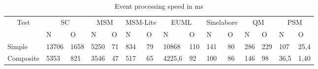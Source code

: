 \begin{table}[]
	\centering
	\caption{Event processing speed in ms}
	\label{table-speed}
	\begin{tabular}{|l|l|l|l|l|l|l|l|l|l|l|l|l|l|l|}
		\hline
		\multicolumn{1}{|c|}{\multirow{2}{*}{Test}} & \multicolumn{2}{c|}{SC} & \multicolumn{2}{c|}{MSM} & \multicolumn{2}{c|}{MSM-Lite} & \multicolumn{2}{c|}{EUML} & \multicolumn{2}{c|}{Sinelabore} & \multicolumn{2}{c|}{QM} & \multicolumn{2}{c|}{PSM} \\ \cline{2-15} 
		\multicolumn{1}{|c|}{}                      & N           & O         & N            & O         & N              & O            & N             & O         & N               & O             & N          & O          & N           & O          \\ \hline
		Simple                                      & 13706       & 1658      & 5250         & 71        & 834            & 79           & 10868         & 110       & 141             & 80            & 286        & 229        & 107         & 25,4       \\ \hline
		Composite                                   & 5353        & 821       & 3546         & 47        & 517            & 65           & 4225,6        & 92        & 100             & 86            & 146        & 98         & 36,5        & 1,40       \\ \hline
	\end{tabular}
\end{table}

